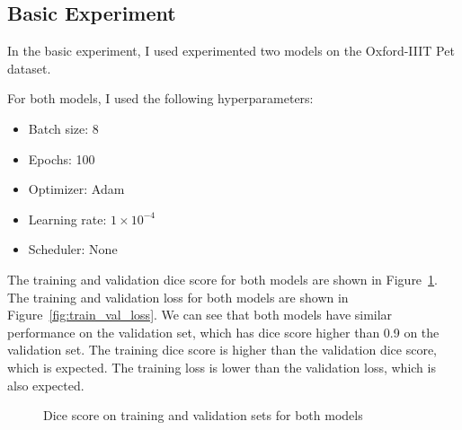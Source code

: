 \subsection{Basic Experiment}

In the basic experiment, I used experimented two models on the Oxford-IIIT Pet dataset.

For both models, I used the following hyperparameters:
\begin{itemize}
    \item Batch size: 8
    \item Epochs: 100
    \item Optimizer: Adam
    \item Learning rate: $1 \times 10^{-4}$
    \item Scheduler: None
\end{itemize}


The training and validation dice score for both models are shown in Figure~\ref{fig:train_val_dice}.
The training and validation loss for both models are shown in Figure~\ref{fig:train_val_loss}.
We can see that both models have similar performance on the validation set, which has dice score higher than 0.9 on the validation set.
The training dice score is higher than the validation dice score, which is expected.
The training loss is lower than the validation loss, which is also expected.

\def \unetexpdir {../log/u1/}
\def \resunetexpdir {../log/ru1/}
\begin{figure}[ht]
    \centering
    \caption{Dice score on training and validation sets for both models}
    \label{fig:train_val_dice}
\end{figure}

